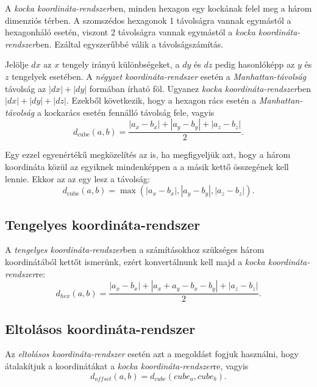 A \textit{kocka koordináta-rendszer}ben, minden hexagon egy kockának felel meg a három dimenziós térben. A szomszédos hexagonok 1 távolságra vannak egymástól a hexagonháló esetén, viszont 2 távolságra vannak egymástól a \textit{kocka koordináta-rendszer}ben. Ezáltal egyszerűbbé válik a távolságszámítás.

Jelölje $dx$ az $x$ tengely irányú különbségeket, a $dy$ és $dz$ pedig hasonlóképp az $y$ és $z$ tengelyek esetében. A \textit{négyzet koordináta-rendszer} esetén a \textit{Manhattan-távolság} távolság az $|dx| + |dy|$ formában írható föl. Ugyanez \textit{kocka koordináta-rendszer}ben $|dx| + |dy| + |dz|$. Ezekből következik, hogy a hexagon rács esetén a \textit{Manhattan-távolság} a kockarács esetén fennálló távolság fele, vagyis
$$
d_{\text{cube}}(a, b) =
\dfrac{|a_x - b_x| + |a_y - b_y| + |a_z - b_z|}{2}.
$$

Egy ezzel egyenértékű megközelítés az is, ha megfigyeljük azt, hogy a három koordináta közül az egyiknek mindenképpen a a másik kettő összegének kell lennie. Ekkor az az egy lesz a távolság:
$$
d_{\text{cube}}(a, b) =
\max(
|a_x - b_x|, |a_y - b_y|, |a_z - b_z|
).
$$

\subsection{Tengelyes koordináta-rendszer}

A \textit{tengelyes koordináta-rendszer}ben a számításokhoz szükséges három koordinátából kettőt ismerünk, ezért konvertálnunk kell majd a \textit{kocka koordináta-rendszer}re:
$$
d_{hex}(a, b) = \frac{|a_x - b_x| + |a_x + a_y - b_x - b_y| + |a_z - b_z|}{2}.
$$

\subsection{Eltolásos koordináta-rendszer}

Az \textit{eltolásos koordináta-rendszer} esetén azt a megoldást fogjuk használni, hogy átalakítjuk a koordinátákat a \textit{kocka koordináta-rendszer}re, vagyis
$$
d_{offset} (a, b) = d_{cube}(cube_a, cube_b).
$$

